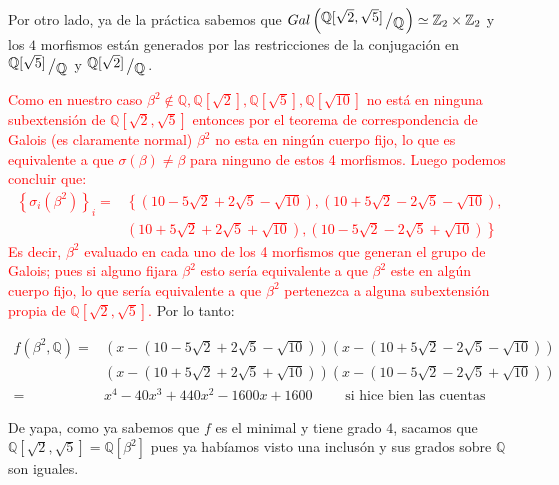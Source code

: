 \documentclass[11pt]{article}
\newcommand{\Q}{\mathbb{Q}}
\newcommand{\Z}{\mathbb{Z}}
\newcommand{\sett}[1]{\left\lbrace#1\right\rbrace}
\newcommand{\quotient}[2]{{\raisebox{.2em}{$#1$}\left/\raisebox{-.2em}{$#2$}\right.}}
\numberwithin{theorem}{subsection}
\begin{document}
\begin{enumerate}
\begin{itemize}
		Por otro lado, ya de la pr\'actica sabemos que $Gal \left(\quotient{\Q[\sqrt{2}, \sqrt{5 }]}{\Q}\right) \simeq \Z_2 \times \Z_2$ y los $4$ morfismos est\'an generados por las restricciones de la conjugaci\'on en $\quotient{\Q[\sqrt{5 }]}{\Q}$ y $\quotient{\Q[\sqrt{2}]}{\Q}$.
		
		\textcolor{red}{Como en nuestro caso $\beta^2 \not\in  \Q,  \Q[\sqrt{2}],  \Q[\sqrt{5 }], \Q[\sqrt{10}]$ no est\'a en ninguna subextensi\'on de $\Q[\sqrt{2}, \sqrt{5}]$ entonces por el teorema de correspondencia de Galois (es claramente normal) $\beta^2$ no esta en ning\'un cuerpo fijo, lo que es equivalente a que $\sigma(\beta) \neq \beta$ para ninguno de estos 4 morfismos. Luego podemos concluir que:
			\begin{equation*}
			\begin{aligned}
			\sett{\sigma_i(\beta^2)}_i = & \left\lbrace \left(10 -5\sqrt{2} + 2\sqrt{5} - \sqrt{10}\right), \left(10 +5\sqrt{2} - 2\sqrt{5} - \sqrt{10}\right), \right.\\ & \left. \left(10 +5\sqrt{2} + 2\sqrt{5} + \sqrt{10}\right), \left(10 -5\sqrt{2} - 2\sqrt{5} + \sqrt{10}\right) \right\rbrace
			\end{aligned}
			\end{equation*}
			Es decir, $\beta^2$ evaluado en cada uno de los 4 morfismos que generan el grupo de Galois; pues si alguno fijara $\beta^2$ esto ser\'ia equivalente a que $\beta^2$ este en alg\'un cuerpo fijo, lo que ser\'ia equivalente a que $\beta^2$ pertenezca a alguna subextensi\'on propia de $\Q[\sqrt{2}, \sqrt{5}]$.
		} Por lo tanto:
		
		\begin{equation*}
			\begin{aligned}
				f \left(\beta^2, \Q\right) = & \left(x - \left(10 -5\sqrt{2} + 2\sqrt{5} - \sqrt{10}\right)\right)\left(x - \left(10 +5\sqrt{2} - 2\sqrt{5} - \sqrt{10}\right)\right) \\
				& \left(x - \left(10 +5\sqrt{2} + 2\sqrt{5} + \sqrt{10}\right)\right)\left(x - \left(10 -5\sqrt{2} - 2\sqrt{5} + \sqrt{10}\right)\right) \\
				= & x^4 - 40x^3 + 440x^2 - 1600 x +1600 \qquad \text{ si hice bien las cuentas}
			\end{aligned}
		\end{equation*}
		
		De yapa, como ya sabemos que $f$ es el minimal y tiene grado $4$, sacamos que $\Q[\sqrt{2}, \sqrt{5}] = \Q[\beta^2]$ pues  ya hab\'iamos visto una inclus\'on y sus grados sobre $\Q$ son iguales.
		

\end{itemize}
\end{enumerate}
\end{document}

